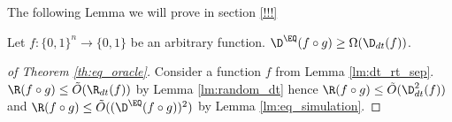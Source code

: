 The following Lemma we will prove in section \ref{!!!}

\begin{lemma}
    \label{lm:eq_simulation}
    Let $f:\{0, 1\}^n \to \{0, 1\}$ be an arbitrary function. $\D^{\EQ}(f \circ g) \ge \Omega(\D_{dt}(f))$.
\end{lemma}



\begin{proof}[of Theorem \ref{th:eq_oracle}]
    Consider a function $f$ from Lemma \ref{lm:dt_rt_sep}. $\R(f \circ g) \le \tilde{O}(\R_{dt}(f))$ by
    Lemma \ref{lm:random_dt} hence $\R(f \circ g) \le \tilde{O}(\D^2_{dt}(f))$ and $\R(f \circ g) \le
    \tilde{O}((\D^{\EQ}(f \circ g))^2)$ by Lemma \ref{lm:eq_simulation}.
\end{proof}